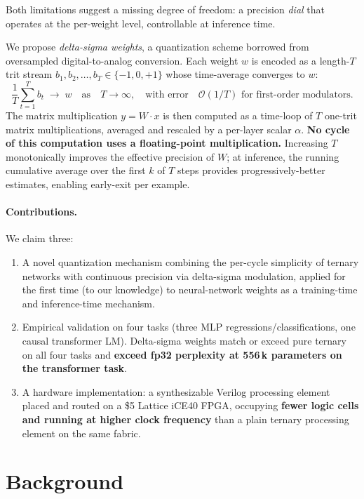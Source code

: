 \documentclass[11pt]{article}
\begin{document}
Both limitations suggest a missing degree of freedom: a precision
\emph{dial} that operates at the per-weight level, controllable at
inference time.

We propose \emph{delta-sigma weights}, a quantization scheme borrowed
from oversampled digital-to-analog conversion. Each weight $w$ is
encoded as a length-$T$ trit stream
$b_1, b_2, \ldots, b_T \in \{-1, 0, +1\}$
whose time-average converges to $w$:
\begin{equation*}
  \frac{1}{T} \sum_{t=1}^{T} b_t \;\longrightarrow\; w
  \quad\text{as}\quad T \to \infty,
  \quad\text{with error}\quad \mathcal{O}(1/T)
  \text{ for first-order modulators.}
\end{equation*}
The matrix multiplication $y = W \cdot x$ is then computed as a
time-loop of $T$ one-trit matrix multiplications, averaged and
rescaled by a per-layer scalar $\alpha$. \textbf{No cycle of this
computation uses a floating-point multiplication.} Increasing $T$
monotonically improves the effective precision of $W$; at inference,
the running cumulative average over the first $k$ of $T$ steps provides
progressively-better estimates, enabling early-exit per example.

\paragraph{Contributions.} We claim three:
\begin{enumerate}
  \item A novel quantization mechanism combining the per-cycle
    simplicity of ternary networks with continuous precision via
    delta-sigma modulation, applied for the first time (to our
    knowledge) to neural-network weights as a training-time and
    inference-time mechanism.
  \item Empirical validation on four tasks (three MLP
    regressions/classifications, one causal transformer LM).
    Delta-sigma weights match or exceed pure ternary on all four
    tasks and \textbf{exceed fp32 perplexity at 556\,k parameters on
    the transformer task}.
  \item A hardware implementation: a synthesizable Verilog processing
    element placed and routed on a \$5 Lattice iCE40 FPGA, occupying
    \textbf{fewer logic cells and running at higher clock frequency}
    than a plain ternary processing element on the same fabric.
\end{enumerate}

\section{Background}
\end{document}
